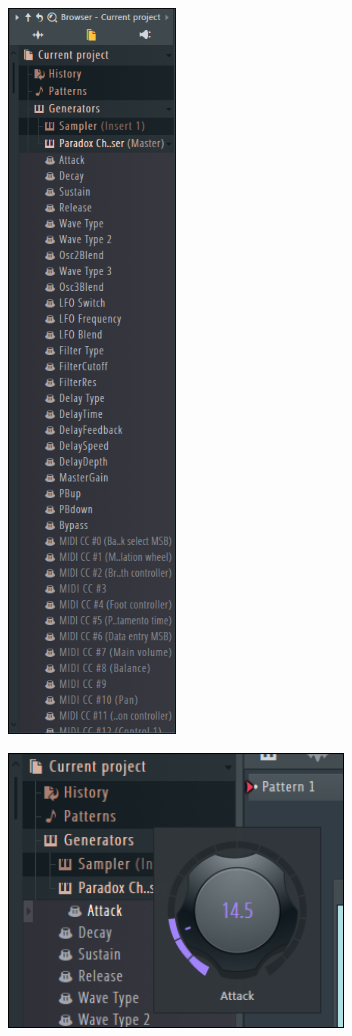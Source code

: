 \documentclass[a4paper,12pt]{report}
\begin{document}
\begin{multicols}{2}
\begin{center}
\includegraphics[width=12em]{BrowserPanel.png}
\end{center}
\end{multicols}





\begin{center}
\includegraphics[width=24em]{ModifyingDetailedMIDI.png}
\end{center}
\end{document}
